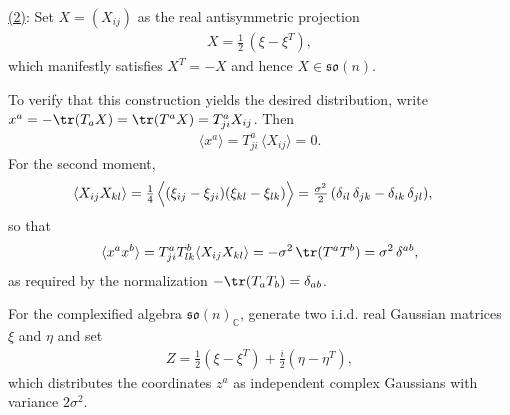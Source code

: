 \noindent\underline{(2)}: Set $X = (X_{ij})$ as the real antisymmetric projection
\begin{align}
  X = \tfrac{1}{2}\,(\xi - \xi^T),
\end{align}
which manifestly satisfies $X^T = -X$ and hence $X \in \mathfrak{so}(n)$.

To verify that this construction yields the desired distribution, write $x^a = -\tr (T_a X) = \tr (T^a X) = T^a_{ji} X_{ij}$. Then
\begin{align}
  \langle x^a \rangle = T^a_{ji}\,\langle X_{ij} \rangle = 0.
\end{align}
For the second moment,
\begin{align}
  \langle X_{ij} X_{kl} \rangle
  &= \tfrac{1}{4}\,\Bigl\langle (\xi_{ij} - \xi_{ji})(\xi_{kl} - \xi_{lk}) \Bigr\rangle
   = \tfrac{\sigma^2}{2}\,(\delta_{il}\,\delta_{jk} - \delta_{ik}\,\delta_{jl}),
\end{align}
so that
\begin{align}
  \langle x^a x^b \rangle = T^a_{ji} T^b_{lk} \langle X_{ij} X_{kl} \rangle
  = -\sigma^2\,\tr (T^a T^b) = \sigma^2\,\delta^{ab},
\end{align}
as required by the normalization $-\tr(T_a T_b)=\delta_{ab}$.

For the complexified algebra $\mathfrak{so}(n)_\mathbb{C}$, generate two i.i.d. real Gaussian matrices $\xi$ and $\eta$ and set
\begin{align}
  Z = \tfrac{1}{2}(\xi - \xi^T) + \tfrac{i}{2}(\eta - \eta^T),
\end{align}
which distributes the coordinates $z^a$ as independent complex Gaussians with variance $2\sigma^2$.


